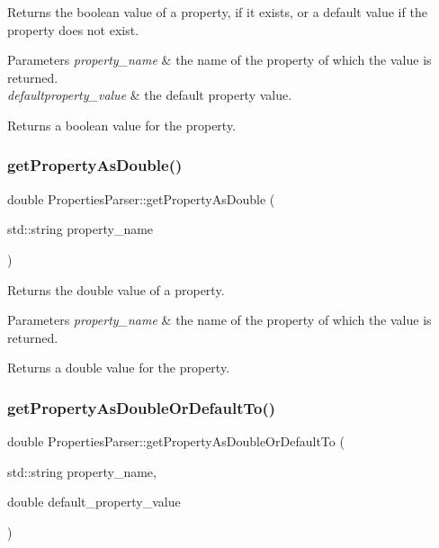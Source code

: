 Returns the boolean value of a property, if it exists, or a default value if the property does not exist.


\begin{DoxyParams}{Parameters}
{\em property\+\_\+name} & the name of the property of which the value is returned. \\
\hline
{\em defaultproperty\+\_\+value} & the default property value. \\
\hline
\end{DoxyParams}
\begin{DoxyReturn}{Returns}
a boolean value for the property. 
\end{DoxyReturn}
\mbox{\label{class_properties_parser_ab7a84135214c45cd91a9bb5377eaff5a}} 
\subsubsection{\texorpdfstring{get\+Property\+As\+Double()}{getPropertyAsDouble()}}
{\footnotesize\ttfamily double Properties\+Parser\+::get\+Property\+As\+Double (\begin{DoxyParamCaption}\item[{std\+::string}]{property\+\_\+name }\end{DoxyParamCaption})}

Returns the double value of a property.


\begin{DoxyParams}{Parameters}
{\em property\+\_\+name} & the name of the property of which the value is returned. \\
\hline
\end{DoxyParams}
\begin{DoxyReturn}{Returns}
a double value for the property. 
\end{DoxyReturn}
\mbox{\label{class_properties_parser_a12598ce9403dd9e51f2a1206db9a27a9}} 
\subsubsection{\texorpdfstring{get\+Property\+As\+Double\+Or\+Default\+To()}{getPropertyAsDoubleOrDefaultTo()}}
{\footnotesize\ttfamily double Properties\+Parser\+::get\+Property\+As\+Double\+Or\+Default\+To (\begin{DoxyParamCaption}\item[{std\+::string}]{property\+\_\+name,  }\item[{double}]{default\+\_\+property\+\_\+value }\end{DoxyParamCaption})}

